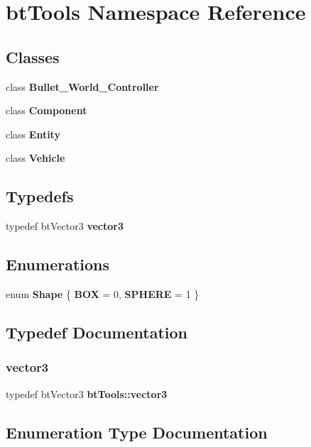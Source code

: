 \section{bt\+Tools Namespace Reference}
\label{namespacebt_tools}
\subsection*{Classes}
\begin{DoxyCompactItemize}
\item 
class \textbf{ Bullet\+\_\+\+World\+\_\+\+Controller}
\item 
class \textbf{ Component}
\item 
class \textbf{ Entity}
\item 
class \textbf{ Vehicle}
\end{DoxyCompactItemize}
\subsection*{Typedefs}
\begin{DoxyCompactItemize}
\item 
typedef bt\+Vector3 \textbf{ vector3}
\end{DoxyCompactItemize}
\subsection*{Enumerations}
\begin{DoxyCompactItemize}
\item 
enum \textbf{ Shape} \{ \textbf{ B\+OX} = 0, 
\textbf{ S\+P\+H\+E\+RE} = 1
 \}
\end{DoxyCompactItemize}


\subsection{Typedef Documentation}
\mbox{\label{namespacebt_tools_a68c861715bf90b8672e16c58927815ee}} 
\subsubsection{vector3}
{\footnotesize\ttfamily typedef bt\+Vector3 \textbf{ bt\+Tools\+::vector3}}



\subsection{Enumeration Type Documentation}
\mbox{\label{namespacebt_tools_a578fa8d9ff62284e4a685a58bad0e845}} 
